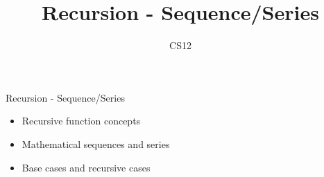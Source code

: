 \documentclass{beamer}
\title{Recursion - Sequence/Series}
\author{CS12}
\date{}
\begin{document}
\begin{frame}
    \titlepage
\end{frame}

\begin{frame}{Recursion - Sequence/Series}
    \begin{itemize}
        \item Recursive function concepts
        \item Mathematical sequences and series
        \item Base cases and recursive cases
    \end{itemize}
\end{frame}
\end{document}
